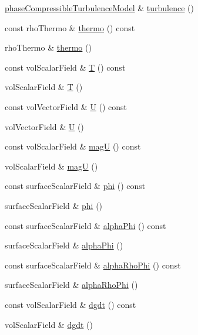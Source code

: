 \begin{DoxyCompactItemize}
\item 
\hyperlink{namespaceFoam_a21fdbb0b53653a278781d894a16c8a88}{phase\+Compressible\+Turbulence\+Model} \& \hyperlink{classFoam_1_1fluid_a5311f27b8a46f9ff42fa93730dee81e0}{turbulence} ()
\item 
const rho\+Thermo \& \hyperlink{classFoam_1_1fluid_a277e4a3765f9d795576a1ca213026477}{thermo} () const
\item 
rho\+Thermo \& \hyperlink{classFoam_1_1fluid_a86ee829ee4c3ae48c2641b8938dabd4d}{thermo} ()
\item 
const vol\+Scalar\+Field \& \hyperlink{classFoam_1_1fluid_a85c764e018a5ea484733827bf227c7af}{T} () const
\item 
vol\+Scalar\+Field \& \hyperlink{classFoam_1_1fluid_aae0cfe1315f717e86f7dc657c35a476d}{T} ()
\item 
const vol\+Vector\+Field \& \hyperlink{classFoam_1_1fluid_a536d168d7b335fe81f506f232b5b4872}{U} () const
\item 
vol\+Vector\+Field \& \hyperlink{classFoam_1_1fluid_a9152a436c08509f3f18e0298a7239d13}{U} ()
\item 
const vol\+Scalar\+Field \& \hyperlink{classFoam_1_1fluid_acf8ba8ee6c5a9062263b284c93b58111}{magU} () const
\item 
vol\+Scalar\+Field \& \hyperlink{classFoam_1_1fluid_acb3f43b4dbc83fb0392a7c04562cff5e}{magU} ()
\item 
const surface\+Scalar\+Field \& \hyperlink{classFoam_1_1fluid_afa376adc6cc59952d2f6f2ad38bba068}{phi} () const
\item 
surface\+Scalar\+Field \& \hyperlink{classFoam_1_1fluid_a66289cf9ede32ce672bb3c21f02ded40}{phi} ()
\item 
const surface\+Scalar\+Field \& \hyperlink{classFoam_1_1fluid_ae6984849624951f976129ba760f2cb3d}{alpha\+Phi} () const
\item 
surface\+Scalar\+Field \& \hyperlink{classFoam_1_1fluid_ad4fa7eb1a78a64edddbfdefe090ffac0}{alpha\+Phi} ()
\item 
const surface\+Scalar\+Field \& \hyperlink{classFoam_1_1fluid_aed70c38fb7edef9dea0159ce01de86f6}{alpha\+Rho\+Phi} () const
\item 
surface\+Scalar\+Field \& \hyperlink{classFoam_1_1fluid_ac84568157c5a273492634b3211bf990d}{alpha\+Rho\+Phi} ()
\item 
const vol\+Scalar\+Field \& \hyperlink{classFoam_1_1fluid_afedabe4abe19bcb26376d6790dc697ed}{dgdt} () const
\item 
vol\+Scalar\+Field \& \hyperlink{classFoam_1_1fluid_ad22a982fd906a6b6688870b9f3f4d00c}{dgdt} ()

\end{DoxyCompactItemize}
